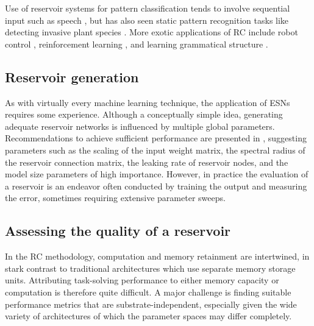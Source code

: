 Use of reservoir systems for pattern classification tends to involve sequential
input such as speech \cite{verstraeten_reservoir-based_2006}, but has also seen
static pattern recognition tasks like detecting invasive plant species
\cite{wootton_optimizing_2017}. More exotic applications of RC include robot
control \cite{aislan_antonelo_learning_2015}, reinforcement learning
\cite{bush_modeling_2005}, and learning grammatical structure
\cite{tong_learning_2007}.

\subsection{Reservoir generation}

As with virtually every machine learning technique, the application of ESNs
requires some experience. Although a conceptually simple idea, generating
adequate reservoir networks is influenced by multiple global
parameters. Recommendations to achieve sufficient performance are presented in
\cite{montavon_practical_2012, jaeger_tutorial_nodate}, suggesting parameters
such as the scaling of the input weight matrix, the spectral radius of the
reservoir connection matrix, the leaking rate of reservoir nodes, and the model
size parameters of high importance. However, in practice the evaluation of a
reservoir is an endeavor often conducted by training the output and measuring
the error, sometimes requiring extensive parameter sweeps.




\subsection{Assessing the quality of a reservoir}

In the RC methodology, computation and memory retainment are intertwined, in
stark contrast to traditional architectures which use separate memory storage
units. Attributing task-solving performance to either memory capacity or
computation is therefore quite difficult. A major challenge is finding suitable
performance metrics that are substrate-independent, especially given the wide
variety of architectures of which the parameter spaces may differ completely.

